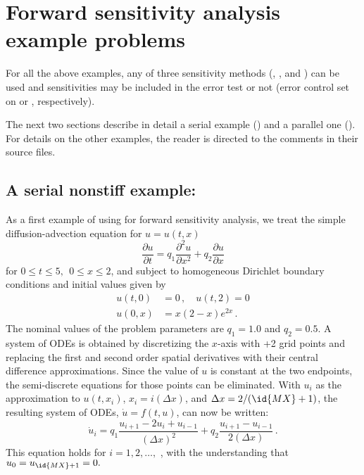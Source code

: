 \section{Forward sensitivity analysis example problems}\label{s:fwd_ex}

For all the above examples, any of three sensitivity methods (, 
, and ) can be used and sensitivities may be 
included in the error test or not (error control set on  or ,
respectively).

The next two sections describe in detail a serial example () and
a parallel one (). For details on the other examples, the reader is
directed to the comments in their source files.

\subsection{A serial nonstiff example: }
\label{ss:cvfnx}

As a first example of using {\cvodes} for forward sensitivity analysis,
we treat the simple diffusion-advection equation
for $u=u(t,x)$
\begin{equation}\label{e:cvfnx_PDE}
  \frac{\partial u}{\partial t}= q_1 \frac{\partial ^{2}u}{\partial x^{2}}
  + q_2 \frac{\partial u}{\partial x}
\end{equation}
for $0 \leq t \leq 5, ~~ 0\leq x \leq 2$, and subject to homogeneous
Dirichlet boundary conditions and initial values given by 
\begin{equation}\label{e:cvfnx_BC_IC}
  \begin{split}
    u(t,0) &= 0 \, , \quad u(t,2) = 0 \\
    u(0,x) &= x(2-x)e^{2x} \, .
  \end{split}
\end{equation}
The nominal values of the problem parameters are $q_1 = 1.0$ and $q_2 = 0.5$.
A system of  ODEs is obtained by discretizing the $x$-axis with +2
grid points and replacing the first and second order spatial derivatives
with their central difference approximations. Since the value of $u$ is
constant at the two endpoints, the semi-discrete equations for those points
can be eliminated.  With $u_{i}$ as the approximation to $u(t,x_{i})$, 
$x_{i} = i(\Delta x)$, and $\Delta x=2/(\id{MX}+1)$, the resulting system of
ODEs, $\dot{u} = f(t,u)$, can now be written:
\begin{equation}\label{e:cvfnx_ODE}
  \dot{u}_i= q_1 \frac{u_{i+1}-2u_{i}+u_{i-1}}{(\Delta x)^{2}}
  + q_2 \frac{u_{i+1}-u_{i-1}}{2(\Delta x)} \, .
\end{equation}
This equation holds for $i=1,2,\ldots ,$ , with the understanding
that $u_{0} = u_{\id{MX}+1}=0.$

